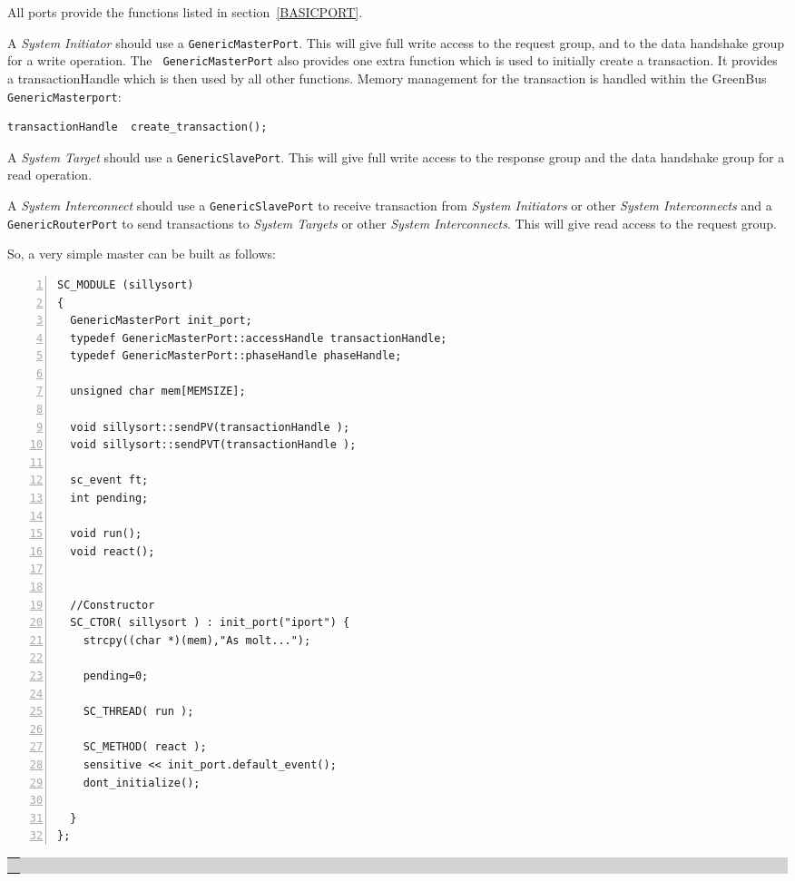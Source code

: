 \documentclass[12pt,oneside]{gsbook}
\newcommand{\master}{{\em System Initiator}\xspace}
\newcommand{\masters}{{\em System Initiators}\xspace}
\newcommand{\slave}{{\em System Target}\xspace}
\newcommand{\slaves}{{\em System Targets}\xspace}
\newcommand{\router}{{\em System Interconnect}\xspace}
\newcommand{\routers}{{\em System Interconnects}\xspace}
\def\example#1{\begin{center}\colorbox{lightgrey}{\begin{tabular}{|p{0.6\paperwidth}|}\hline\\#1\\ \\ \hline\end{tabular}}\end{center}}
\newenvironment{exampleenv}{\begin{lrbox}{\examplebox}\begin{minipage}{0.6\paperwidth}}{\end{minipage}\end{lrbox}\example{\usebox{\examplebox}}}
\begin{document}
All ports provide the functions listed in section~\ref{BASICPORT}.

A \master should use a {\tt GenericMasterPort}. This will give full write access to the request group,
and to the data handshake group for a write operation. The {\tt
GenericMasterPort} also provides one extra function which is used to
initially create a transaction. It provides a transactionHandle which
is then used by all other functions. Memory management for the
transaction is handled within the GreenBus  {\tt GenericMasterport}:
\begin{verbatim}
transactionHandle  create_transaction();
\end{verbatim}

A \slave should use a {\tt GenericSlavePort}. This will give full write access to the response group
and the data handshake group for a read operation.

A \router should use a {\tt GenericSlavePort}  to receive transaction from \masters or other \routers
and a {\tt GenericRouterPort} to send transactions to \slaves or other \routers. This will give read
access to the request group.

So, a very simple master can be built as follows:

\begin{exampleenv}
\begin{Verbatim}[numbers=left,fontsize=\small]
SC_MODULE (sillysort)
{
  GenericMasterPort init_port;
  typedef GenericMasterPort::accessHandle transactionHandle;
  typedef GenericMasterPort::phaseHandle phaseHandle;

  unsigned char mem[MEMSIZE];

  void sillysort::sendPV(transactionHandle );
  void sillysort::sendPVT(transactionHandle );
  
  sc_event ft;
  int pending;
  
  void run();
  void react();
  

  //Constructor
  SC_CTOR( sillysort ) : init_port("iport") {
    strcpy((char *)(mem),"As molt...");

    pending=0;
    
    SC_THREAD( run );

    SC_METHOD( react );
    sensitive << init_port.default_event();
    dont_initialize();

  }
};

\end{Verbatim}
\end{exampleenv}
\end{document}
